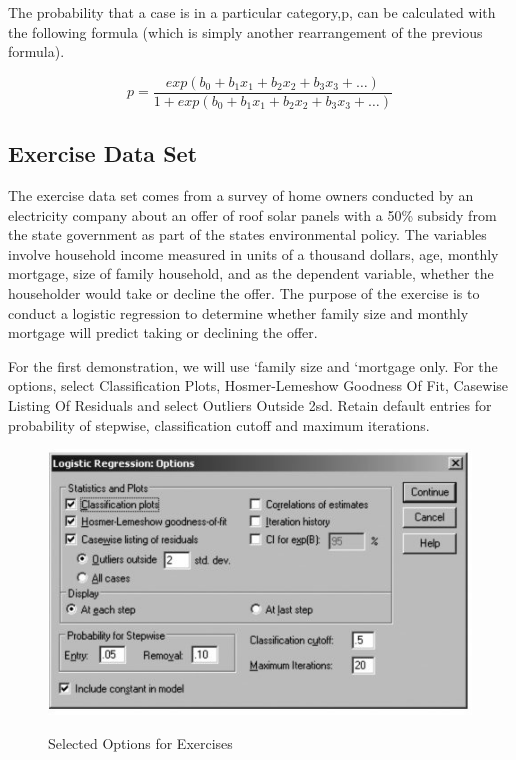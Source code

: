 \documentclass[a4paper,12pt]{article}
\begin{document}
The probability that a case is in a particular category,p, can be calculated with the following formula (which is simply another rearrangement of the previous formula).

\[p = \frac{exp(b_0 + b_1x_1 + b_2x_2 + b_3x_3 + \ldots)}{1 + exp(b_0 + b_1x_1 + b_2x_2 + b_3x_3 + \ldots)}\]

\newpage
\subsection{Exercise Data Set}
The exercise data set comes from a survey of home owners
conducted by an electricity company about an offer of roof solar panels with a 50\% subsidy
from the state government as part of the states environmental policy. The variables involve
household income measured in units of a thousand dollars, age, monthly mortgage, size of
family household, and as the dependent variable, whether the householder would take or decline the offer.
The purpose of the exercise is to conduct a logistic regression to determine whether family
size and monthly mortgage will predict taking or declining the offer.

For the first demonstration, we will use `family size and
`mortgage only. For the options, select Classification Plots, Hosmer-Lemeshow Goodness
Of Fit, Casewise Listing Of Residuals and select Outliers Outside 2sd. Retain default
entries for probability of stepwise, classification cutoff and maximum iterations.

\begin{figure}[h!]
\begin{center}
  \includegraphics[scale=0.8]{images/Logistic10}\\
  \caption{Selected Options for Exercises}
\end{center}
\end{figure}
\end{document}
